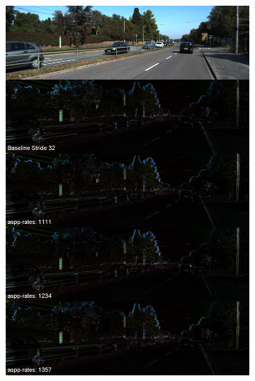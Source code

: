 \begin{figure}[h!]
\begin{subfigure}[c]{0.24\textwidth}
\includegraphics[width=\textwidth]{images/visual_comparisons/reconstruction_error/concat_024.png}
\end{subfigure}
\begin{subfigure}[c]{0.24\textwidth}

\end{subfigure}
\end{figure}
